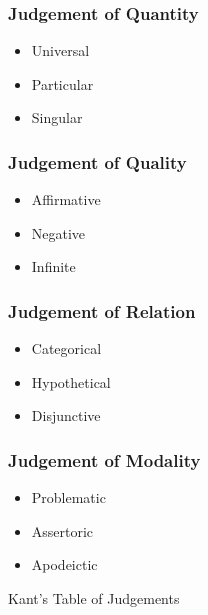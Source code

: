 \begin{figure}[H]
  \centering
  \begin{multicols}{2}
    \subsubsection*{Judgement of Quantity}
    \begin{itemize}
      \item Universal
      \item Particular
      \item Singular
    \end{itemize}

    \subsubsection*{Judgement of Quality}
    \begin{itemize}
      \item Affirmative
      \item Negative
      \item Infinite
    \end{itemize}

    \columnbreak
    \subsubsection*{Judgement of Relation}
    \begin{itemize}
      \item Categorical
      \item Hypothetical
      \item Disjunctive
    \end{itemize}

    \subsubsection*{Judgement of Modality}
    \begin{itemize}
      \item Problematic
      \item Assertoric
      \item Apodeictic
    \end{itemize}
  \end{multicols}
  \caption{Kant's Table of Judgements}
  \label{judgements}
\end{figure}
